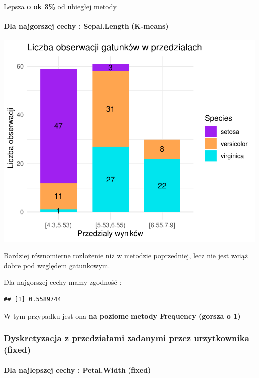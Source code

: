 \documentclass[
  12pt,
]{article}
\begin{document}
Lepsza \textbf{o ok 3\%} od ubiegłej metody

\paragraph{Dla najgorszej cechy : Sepal.Length
(K-means)}\label{dla-najgorszej-cechy-sepal.length-k-means}

\begin{center}\includegraphics{Sprawozdanie2_files/figure-latex/tabela_kondygnacji_3_najg-1} \end{center}

Bardziej równomierne rozłożenie niż w metodzie poprzedniej, lecz nie
jest wciąż dobre pod względem gatunkowym.

Dla najgorszej cechy mamy zgodność :

\begin{verbatim}
## [1] 0.5589744
\end{verbatim}

W tym przypadku jest ona \textbf{na poziome metody Frequency (gorsza o
1)}

\subsubsection{Dyskretyzacja z przedziałami zadanymi przez urzytkownika
(fixed)}\label{dyskretyzacja-z-przedziaux142ami-zadanymi-przez-urzytkownika-fixed}

\paragraph{Dla najlepszej cechy : Petal.Width
(fixed)}\label{dla-najlepszej-cechy-petal.width-fixed}
\end{document}
